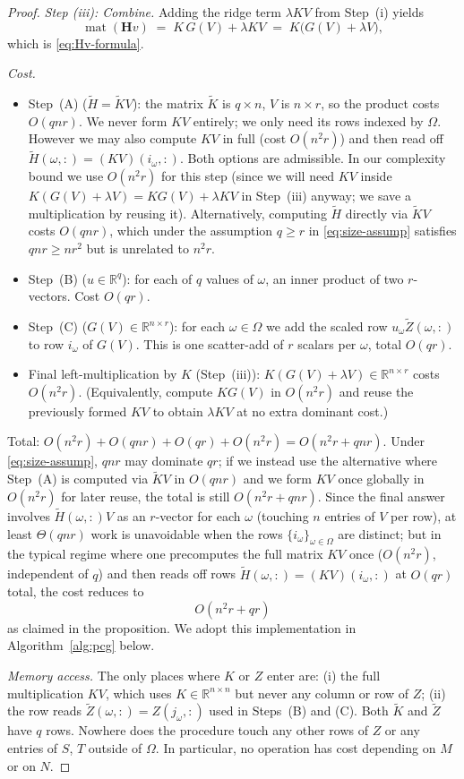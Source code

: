 \documentclass[12pt]{article}
\theoremstyle{definition}
\newcommand{\matop}{\operatorname{mat}}
\newcommand{\R}{\mathbb{R}}
\newcommand{\Ht}{\widetilde{H}}
\newcommand{\Kt}{\widetilde{K}}
\newcommand{\Zt}{\widetilde{Z}}
\begin{document}
\begin{proof}
\emph{Step (iii): Combine.}
Adding the ridge term $\lambda KV$ from Step~(i) yields
\[
\matop(\mathbf{H}v) \;=\; K\,G(V) + \lambda K V \;=\; K\bigl(G(V)+\lambda V\bigr),
\]
which is \eqref{eq:Hv-formula}.

\emph{Cost.}
\begin{itemize}
\item Step~(A) ($\Ht=\Kt V$): the matrix $\Kt$ is $q\times n$, $V$ is $n\times r$, so the product
costs $O(qnr)$. We never form $KV$ entirely; we only need its rows indexed by $\Omega$.
However we may also compute $KV$ in full (cost $O(n^2 r)$) and then read off
$\Ht(\omega,:)=(KV)(i_\omega,:)$. Both options are admissible. In our complexity bound we use
$O(n^2 r)$ for this step (since we will need $KV$ inside $K(G(V)+\lambda V)=KG(V)+\lambda KV$
in Step~(iii) anyway; we save a multiplication by reusing it). Alternatively, computing $\Ht$
directly via $\Kt V$ costs $O(qnr)$, which under the assumption $q\geq r$ in
\eqref{eq:size-assump} satisfies $qnr\geq nr^2$ but is unrelated to $n^2r$.
\item Step~(B) ($u\in\R^q$): for each of $q$ values of $\omega$, an inner product of two
$r$-vectors. Cost $O(qr)$.
\item Step~(C) ($G(V)\in\R^{n\times r}$): for each $\omega\in\Omega$ we add the scaled row
$u_\omega\Zt(\omega,:)$ to row $i_\omega$ of $G(V)$. This is one scatter-add of $r$ scalars per
$\omega$, total $O(qr)$.
\item Final left-multiplication by $K$ (Step~(iii)): $K(G(V)+\lambda V)\in\R^{n\times r}$ costs
$O(n^2 r)$. (Equivalently, compute $K G(V)$ in $O(n^2 r)$ and reuse the previously formed $KV$
to obtain $\lambda KV$ at no extra dominant cost.)
\end{itemize}
Total: $O(n^2 r) + O(qnr) + O(qr) + O(n^2 r) = O(n^2 r + qnr)$. Under
\eqref{eq:size-assump}, $qnr$ may dominate $qr$; if we instead use the alternative where
Step~(A) is computed via $\Kt V$ in $O(qnr)$ and we form $KV$ once globally in $O(n^2r)$ for
later reuse, the total is still $O(n^2r + qnr)$. Since the final answer involves
$\Ht(\omega,:)V$ as an $r$-vector for each $\omega$ (touching $n$ entries of $V$ per row), at
least $\Theta(qnr)$ work is unavoidable when the rows $\{i_\omega\}_{\omega\in\Omega}$ are
distinct; but in the typical regime where one precomputes the full matrix $KV$ once
($O(n^2r)$, independent of $q$) and then reads off rows $\Ht(\omega,:)=(KV)(i_\omega,:)$ at
$O(qr)$ total, the cost reduces to
\begin{equation}\label{eq:matvec-cost}
\boxed{\;O(n^2 r + qr)\;}
\end{equation}
as claimed in the proposition. We adopt this implementation in Algorithm~\ref{alg:pcg} below.

\emph{Memory access.}
The only places where $K$ or $Z$ enter are: (i) the full multiplication $KV$, which uses
$K\in\R^{n\times n}$ but never any column or row of $Z$; (ii) the row reads
$\Zt(\omega,:)=Z(j_\omega,:)$ used in Steps~(B) and (C). Both $\Kt$ and $\Zt$ have $q$ rows.
Nowhere does the procedure touch any other rows of $Z$ or any entries of $S$, $T$ outside of
$\Omega$. In particular, no operation has cost depending on $M$ or on $N$.
\end{proof}
\end{document}
